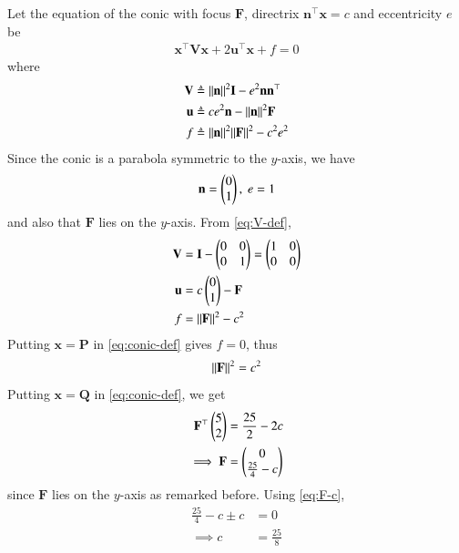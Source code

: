 \documentclass[journal,12pt,twocolumn]{IEEEtran}
\renewcommand{\vec}[1]{\boldsymbol{\mathbf{#1}}}
\begin{document}
\begin{enumerate}
    \solution Let the equation of the conic with focus $\vec{F}$, directrix
    $\vec{n}^\top\vec{x} = c$ and eccentricity $e$ be
    \begin{align}
        \vec{x}^\top\vec{V}\vec{x} + 2\vec{u}^\top\vec{x} + f = 0
        \label{eq:conic-def}
    \end{align}
    where
    \begin{align}
        \vec{V} &\triangleq \norm{\vec{n}}^2\vec{I} - e^2\vec{n}\vec{n}^\top \label{eq:V-def} \\
        \vec{u} &\triangleq ce^2\vec{n} - \norm{\vec{n}}^2\vec{F} \label{eq:u-def} \\
        f &\triangleq \norm{\vec{n}}^2\norm{\vec{F}}^2 - c^2e^2 \label{eq:f-def}
    \end{align}
    Since the conic is a parabola symmetric to the $y$-axis, we have
    \begin{align}
        \vec{n} = \myvec{0\\1},\ e = 1
    \end{align}
    and also that $\vec{F}$ lies on the $y$-axis. From \eqref{eq:V-def},
    \begin{align}
        \vec{V} &= \vec{I} - \myvec{0&0\\0&1} = \myvec{1&0\\0&0} \\
        \vec{u} &= c\myvec{0\\1} - \vec{F} \\
        f &= \norm{\vec{F}}^2 - c^2
    \end{align}
    Putting $\vec{x} = \vec{P}$ in \eqref{eq:conic-def} gives $f = 0$, thus 
    \begin{align}
        \norm{\vec{F}}^2 = c^2
        \label{eq:F-c}
    \end{align}
    Putting $\vec{x} = \vec{Q}$ in \eqref{eq:conic-def}, we get
    \begin{align}
        \vec{F}^\top\myvec{5\\2} &= \frac{25}{2} - 2c \label{eq:p1} \\
        \implies \vec{F} &= \myvec{0\\\frac{25}{4}-c} \label{eq:F-coords}
    \end{align}
    since $\vec{F}$ lies on the $y$-axis as remarked before. Using 
    \eqref{eq:F-c},
    \begin{align}
        \frac{25}{4}-c\pm c &= 0 \\
        \implies c &= \frac{25}{8}
    \end{align}

\end{enumerate}
\end{document}
